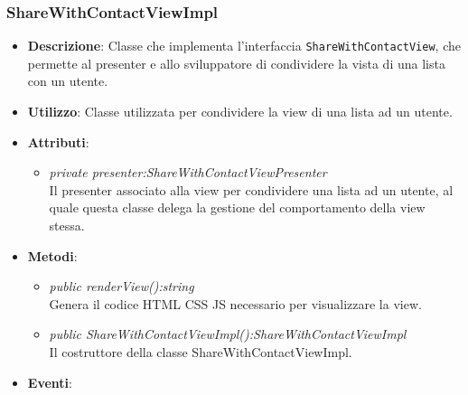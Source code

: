 \subsubsection{ShareWithContactViewImpl}
\begin{itemize}
\item \textbf{Descrizione}: Classe che implementa l'interfaccia \texttt{ShareWithContactView}, che permette al presenter e allo sviluppatore di condividere la vista di una lista con un utente.
\item \textbf{Utilizzo}: Classe utilizzata per condividere la view di una lista ad un utente.
\item \textbf{Attributi}: 
\begin{itemize}
\item \textit{private presenter:ShareWithContactViewPresenter}\\
	Il presenter associato alla view per condividere una lista ad un utente, al quale questa classe delega la gestione del comportamento della view stessa.
\end{itemize}
\item \textbf{Metodi}:
\begin{itemize}
\item \textit{public renderView():string}\\
	Genera il codice HTML CSS JS necessario per visualizzare la view.
\item \textit{public ShareWithContactViewImpl():ShareWithContactViewImpl}\\
	Il costruttore della classe ShareWithContactViewImpl.
\end{itemize}
\item \textbf{Eventi}:
\end{itemize}

